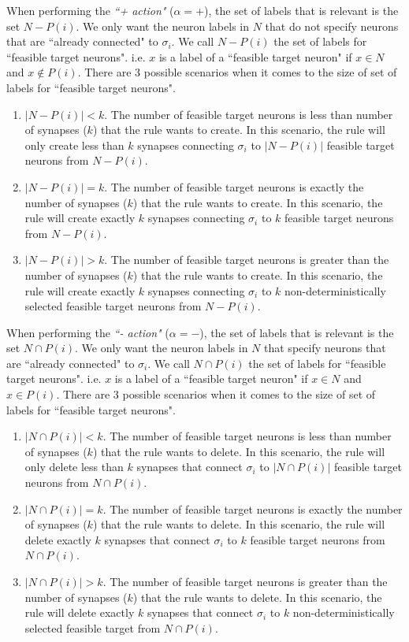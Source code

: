 \documentclass[runningheads,a4paper]{llncs}
\begin{document}
When performing the \textit{``+ action"} ($\alpha = +$), the set of labels that is relevant is the set $N-P(i)$. We only want the neuron labels 
in $N$ that do not specify neurons that are ``already connected" to $\sigma_i$. We call $N-P(i)$  the set of labels for ``feasible target neurons". 
i.e. $x$ is a label of a ``feasible target neuron" if $x \in N$ and $x \not\in P(i)$. There are 3 possible scenarios when it comes to the size of
set of labels for ``feasible target neurons". 
\begin{enumerate}
   \item $|N-P(i)| < k$. The number of feasible target neurons is less than number of synapses ($k$) that the rule wants to create. In this scenario,
         the rule will only create less than $k$ synapses connecting $\sigma_i$ to $|N-P(i)|$ feasible target neurons from $N-P(i)$.
   \item $|N-P(i)| = k$. The number of feasible target neurons is exactly the number of synapses ($k$) that the rule wants to create. In this 
         scenario, the rule will create exactly $k$ synapses connecting $\sigma_i$ to $k$ feasible target neurons from $N-P(i)$.
   \item $|N-P(i)| > k$. The number of feasible target neurons is greater than the number of synapses ($k$) that the rule wants to create. In this 
         scenario, the rule will create exactly $k$ synapses connecting $\sigma_i$ to $k$ non-deterministically selected feasible target neurons from 
         $N-P(i)$.
\end{enumerate}

When performing the \textit{``- action"} ($\alpha = -$), the set of labels that is relevant is the set $N \cap P(i)$. We only want the neuron labels 
in $N$ that specify neurons that are ``already connected" to $\sigma_i$. We call $N \cap P(i)$  the set of labels for ``feasible target neurons". 
i.e. $x$ is a label of a ``feasible target neuron" if $x \in N$ and $x \in P(i)$. There are 3 possible scenarios when it comes to the size of
set of labels for ``feasible target neurons". 
\begin{enumerate}
   \item $|N \cap P(i)| < k$. The number of feasible target neurons is less than number of synapses ($k$) that the rule wants to delete. In this
         scenario, the rule will only delete less than $k$ synapses that connect $\sigma_i$ to $|N \cap P(i)|$ feasible target neurons from $N \cap 
         P(i)$.
   \item $|N \cap P(i)| = k$. The number of feasible target neurons is exactly the number of synapses ($k$) that the rule wants to delete. In this 
         scenario, the rule will delete exactly $k$ synapses that connect $\sigma_i$ to $k$ feasible target neurons from $N \cap P(i)$.
   \item $|N \cap P(i)| > k$. The number of feasible target neurons is greater than the number of synapses ($k$) that the rule wants to delete. In 
         this scenario, the rule will delete exactly $k$ synapses that connect $\sigma_i$ to $k$ non-deterministically selected feasible target 
         from $N \cap P(i)$.
\end{enumerate}
\end{document}
